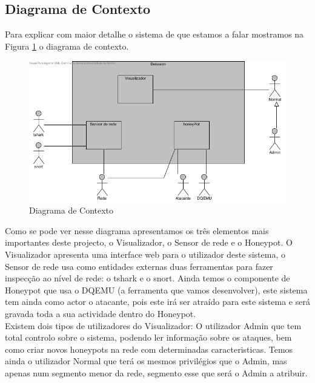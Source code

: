 \subsection{Diagrama de Contexto}
Para explicar com maior detalhe o sistema de que estamos a falar mostramos na Figura \ref{fig:dcont} o diagrama de contexto.

\begin{figure}[!ht]
\centering
\includegraphics[scale=0.8]{images/DiagramaContexto}
\caption{Diagrama de Contexto}
\label{fig:dcont}
\end{figure}

Como se pode ver nesse diagrama apresentamos os três elementos mais importantes deste projecto, o Visualizador, o Sensor de rede e o Honeypot.
O Visualizador apresenta uma interface web para o utilizador deste sistema, o Sensor de rede usa como entidades externas duas ferramentas para fazer inspecção
ao nível de rede: o tshark e o snort. Ainda temos o componente de Honeypot que usa o DQEMU (a ferramenta que vamos desenvolver), este sistema tem ainda
como actor o atacante, pois este irá ser atraído para este sistema e será gravada toda a sua actividade dentro do Honeypot.\\
Existem dois tipos de utilizadores do Visualizador: O utilizador Admin que tem total controlo sobre o sistema, podendo ler informação sobre os ataques, bem como
criar novos honeypots na rede com determinadas caracteristicas. Temos ainda o utilizador Normal que terá os mesmos privilégios que o Admin, mas apenas num
segmento menor da rede, segmento esse que será o Admin a atribuir.


